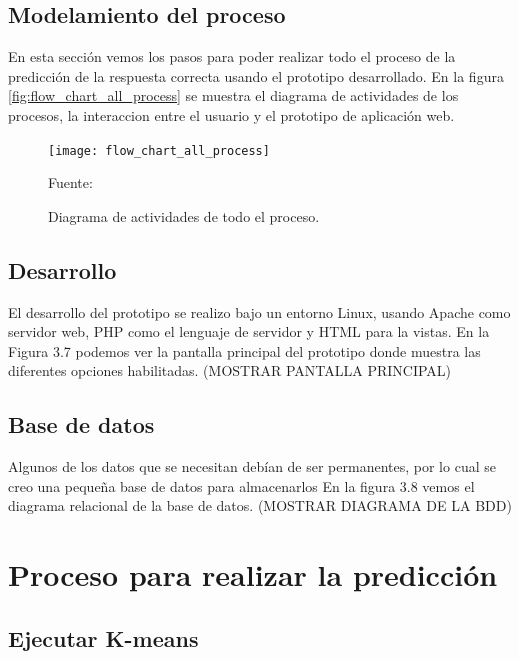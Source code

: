 \subsection{Modelamiento del proceso}

En esta sección vemos los pasos para poder realizar todo el proceso de la predicción de la respuesta correcta usando el prototipo desarrollado. En la figura \ref{fig:flow_chart_all_process} se muestra el diagrama de actividades de los procesos, la interaccion entre el usuario y el prototipo de aplicación web.

\begin{figure}[ht]
	\begin{center}
		\texttt{[image: flow\_chart\_all\_process]}
	\end{center}
	\begin{center}
		\vskip -0.5cm
		\caption{\small{Diagrama de actividades de todo el proceso.}}
		{\small{Fuente: }}
	\end{center}
\end{figure}


\subsection{Desarrollo}

El desarrollo del prototipo se realizo bajo un entorno Linux, usando Apache como servidor web, PHP como el lenguaje de servidor y HTML para la vistas. En la Figura 3.7 podemos ver la pantalla principal del prototipo donde muestra las diferentes opciones habilitadas. (MOSTRAR PANTALLA PRINCIPAL)

\subsection{Base de datos}
Algunos de los datos que se necesitan debían de ser permanentes, por lo cual se creo una pequeña base de datos para almacenarlos En la figura 3.8 vemos el diagrama relacional de la base de datos. (MOSTRAR DIAGRAMA DE LA BDD)


\section{Proceso para realizar la predicción} 

\subsection{Ejecutar K-means}

